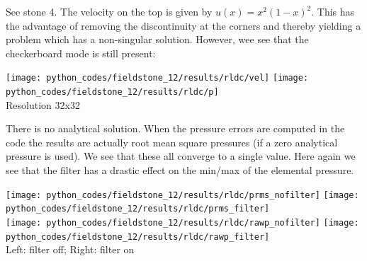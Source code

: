 See stone 4. The velocity on the top is given by $u(x)=x^2(1-x)^2$.
This has the advantage of removing the discontinuity at the corners and 
thereby yielding a problem which has a non-singular solution.
However, wee see that the checkerboard mode is still present:

\begin{center}
\texttt{[image: python\_codes/fieldstone\_12/results/rldc/vel]}
\texttt{[image: python\_codes/fieldstone\_12/results/rldc/p]}\\
{\captionfont Resolution 32x32}
\end{center}

There is no analytical solution. When the pressure errors are computed in the code
the results are actually root mean square pressures (if a zero analytical pressure 
is used). We see that these all converge to a single value.
Here again we see that the filter has a drastic effect on the min/max 
of the elemental pressure. 
\begin{center}
\texttt{[image: python\_codes/fieldstone\_12/results/rldc/prms\_nofilter]}
\texttt{[image: python\_codes/fieldstone\_12/results/rldc/prms\_filter]}\\
\texttt{[image: python\_codes/fieldstone\_12/results/rldc/rawp\_nofilter]}
\texttt{[image: python\_codes/fieldstone\_12/results/rldc/rawp\_filter]}\\
{\captionfont Left: filter off; Right: filter on}
\end{center}


